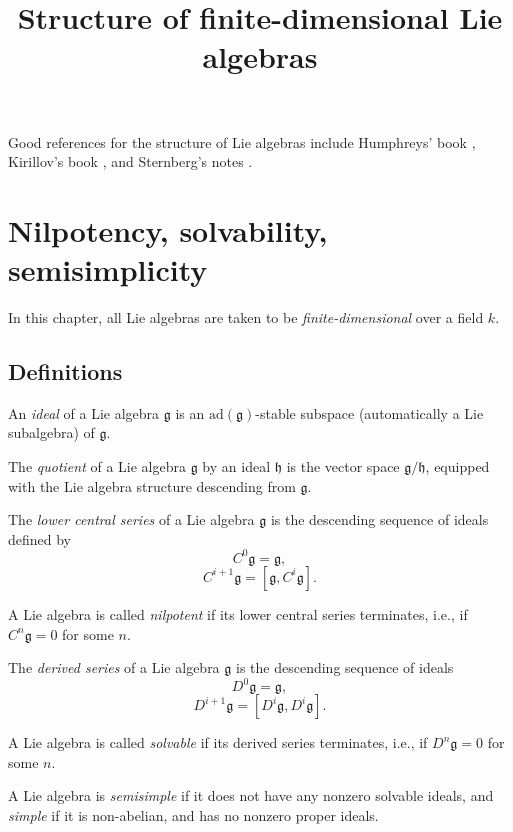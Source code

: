 

%


\title{Structure of finite-dimensional Lie algebras}


\maketitle

\label{section-phantom}

\tableofcontents

Good references for the structure of Lie algebras include Humphreys' book \cite{Humphreys-Lie}, Kirillov's book \cite{Kirillov-Lie}, and Sternberg's notes \cite{Sternberg}.

\section{Nilpotency, solvability, semisimplicity}
\label{section-nilpotent-solvable}


In this chapter, all Lie algebras are taken to be \emph{finite-dimensional} over a field $k$.

\subsection{Definitions}
\label{subsection-definitions-nilpotent-solvable}

\begin{definition}
 \label{definition-ideal}
An {\it ideal} of a Lie algebra $\mathfrak g$ is an $\text{ad}(\mathfrak g)$-stable subspace (automatically a Lie subalgebra) of $\mathfrak g$.

The {\it quotient} of a Lie algebra $\mathfrak g$ by an ideal $\mathfrak h$ is the vector space $\mathfrak g/\mathfrak h$, equipped with the Lie algebra structure descending from $\mathfrak g$.
\end{definition}



\begin{definition}
 \label{definition-nilpotent-solvable-semisimple}
The {\it lower central series} of a Lie algebra $\mathfrak g$ is the descending sequence of ideals defined by
$$ C^0\mathfrak g = \mathfrak g,$$
$$ C^{i+1}\mathfrak g = [\mathfrak g, C^i\mathfrak g].$$
 
 
A Lie algebra is called {\it nilpotent} if its lower central series terminates, i.e., if $C^n\mathfrak g=0$ for some $n$.


The {\it derived series} of a Lie algebra $\mathfrak g$ is the descending sequence of ideals
$$ D^0\mathfrak g = \mathfrak g,$$
$$ D^{i+1}\mathfrak g = [D^i\mathfrak g, D^i\mathfrak g].$$

A Lie algebra is called {\it solvable} if its derived series terminates, i.e., if $D^n\mathfrak g=0$ for some $n$.

A Lie algebra is {\it semisimple} if it does not have any nonzero solvable ideals, and {\it simple} if it is non-abelian, and has no nonzero proper ideals.
\end{definition}

